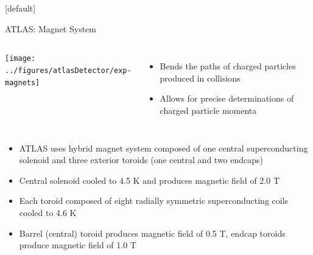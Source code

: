 \documentclass{beamer}
\begin{document}
{  \makeatletter %
  [default]
  \def\beamer@entrycode{\vspace*{-1.075\headheight}}
  \begin{frame}{ATLAS: Magnet System}
    \vspace{10pt}
    \begin{columns}
      \texttt{[image: ../figures/atlasDetector/exp-magnets]}
      \begin{itemize}\small
        \item Bends the paths of charged particles produced in collisions
        \item Allows for precise determinations of charged particle momenta
        \end{itemize}  
    \end{columns}
    \vspace{-5pt}
    \begin{itemize}\small
    \item ATLAS uses hybrid magnet system composed of one central superconducting solenoid and three exterior toroids (one central and two endcaps)    
    \item Central solenoid cooled to 4.5 K and produces magnetic field of 2.0 T
    \item Each toroid composed of eight radially symmetric superconducting coils cooled to 4.6 K
    \item Barrel (central) toroid produces magnetic field of 0.5 T, endcap toroids produce magnetic field of 1.0 T
    \end{itemize}  
  \end{frame}
  
}
\end{document}
